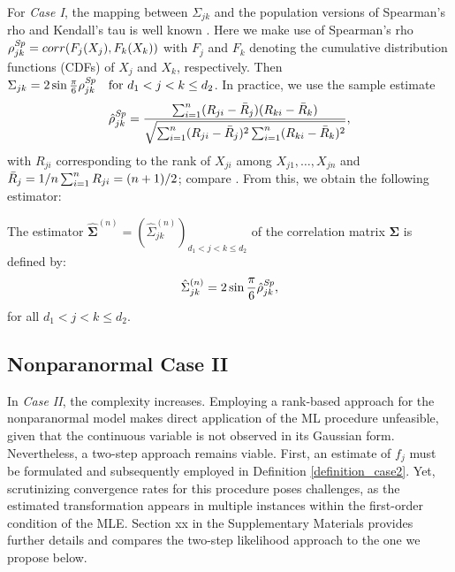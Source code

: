 For \textit{Case I}, the mapping between $\Sigma_{jk}$ and the population versions of Spearman's rho and Kendall's tau is well known \citep{Liu09}. Here we make use of Spearman's rho $\rho^{\text{\textit{Sp}}}_{jk} = corr(F_j(X_j),F_k(X_k))$ with $F_j$ and $F_k$ denoting the cumulative distribution functions (CDFs) of $X_j$ and $X_k$, respectively. Then $\Sigma_{jk} = 2\sin{\frac{\pi}{6} \rho^{\text{\textit{Sp}}}_{jk}} \quad \text{for } d_1  < j < k \leq d_2$. In practice, we use the sample estimate
\begin{equation*}
    \hat{\rho}^{\text{\textit{Sp}}}_{jk} = \frac{\sum_{i=1}^n (R_{ji} - \Bar{R}_{j}) (R_{ki} - \Bar{R}_{k})}{\sqrt{\sum_{i=1}^n(R_{ji} - \Bar{R}_{j})^2\sum_{i=1}^n(R_{ki} - \Bar{R}_{k})^2}},
\end{equation*}
with $R_{ji}$ corresponding to the rank of $X_{ji}$ among $X_{j1}, \dots, X_{jn}$ and $\Bar{R}_{j} = 1/n \sum_{i=1}^n R_{ji} = (n+1)/2$; compare \cite{Liu12}. From this, we obtain the following estimator:
\begin{definition}\label{case1_nonpara}
    The estimator $\hat{\mathbf{\Sigma}}^{(n)} = (\hat{\Sigma}_{jk}^{(n)})_{d_1 < j< k\leq d_2}$ of the correlation matrix $\mathbf{\Sigma}$ is defined by:
    \begin{equation}\label{spearman_mapping}
        \hat{\Sigma}_{jk}^{(n)} = 2\sin{\frac{\pi}{6} \hat{\rho}^{\text{\textit{Sp}}}_{jk}},
    \end{equation}
    for all $d_1 < j < k \leq d_2$.
\end{definition}

\subsection{Nonparanormal Case II}\label{sec::nonparanormal_case2}

In \textit{Case II}, the complexity increases. Employing a rank-based approach for the nonparanormal model makes direct application of the ML procedure unfeasible, given that the continuous variable is not observed in its Gaussian form. Nevertheless, a two-step approach remains viable. First, an estimate of \(f_j\) must be formulated and subsequently employed in Definition \ref{definition_case2}. Yet, scrutinizing convergence rates for this procedure poses challenges, as the estimated transformation appears in multiple instances within the first-order condition of the MLE. Section xx in the Supplementary Materials provides further details and compares the two-step likelihood approach to the one we propose below.


